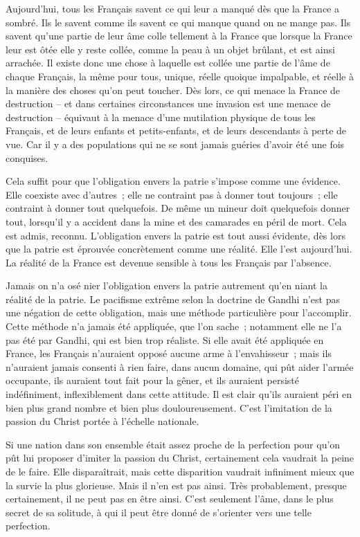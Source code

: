 \documentclass[french,twoside]{book} %
\begin{document}
Aujourd'hui, tous les Français savent ce qui leur a manqué dès que la France a sombré. Ils le savent comme ils savent ce qui manque quand on ne mange pas. Ils savent qu'une partie de leur âme colle tellement à la France que lorsque la France leur est ôtée elle y reste collée, comme la peau à un objet brûlant, et est ainsi arrachée. Il existe donc une chose à laquelle est collée une partie de l'âme de chaque Français, la même pour tous, unique, réelle quoique impalpable, et réelle à la manière des choses qu'on peut toucher. Dès lors, ce qui menace la France de destruction – et dans certaines circonstances une invasion est une menace de destruction – équivaut à la menace d'une mutilation physique de tous les Français, et de leurs enfants et petits-enfants, et de leurs descendants à perte de vue. Car il y a des populations qui ne se sont jamais guéries d'avoir été une fois conquises.\par
Cela suffit pour que l'obligation envers la patrie s'impose comme une évidence. Elle coexiste avec d'autres ; elle ne contraint pas à donner tout toujours ; elle contraint à donner tout quelquefois. De même un mineur doit quelquefois donner tout, lorsqu'il y a accident dans la mine et des camarades en péril de mort. Cela est admis, reconnu. L'obligation envers la patrie est tout aussi évidente, dès lors que la patrie est éprouvée concrètement comme une réalité. Elle l'est aujourd'hui. La réalité de la France est devenue sensible à tous les Français par l'absence.\par
Jamais on n'a osé nier l'obligation envers la patrie autrement qu'en niant la réalité de la patrie. Le pacifisme extrême selon la doctrine de Gandhi n'est pas une négation de cette obligation, mais une méthode particulière pour l'accomplir. Cette méthode n'a jamais été appliquée, que l'on sache ; notamment elle ne l'a pas été par Gandhi, qui est bien trop réaliste. Si elle avait été appliquée en France, les Français n'auraient opposé aucune arme à l'envahisseur ; mais ils n'auraient jamais consenti à rien faire, dans aucun domaine, qui pût aider l'armée occupante, ils auraient tout fait pour la gêner, et ils auraient persisté indéfiniment, inflexiblement dans cette attitude. Il est clair qu'ils auraient péri en bien plus grand nombre et bien plus douloureusement. C'est l'imitation de la passion du Christ portée à l'échelle nationale.\par
Si une nation dans son ensemble était assez proche de la perfection pour qu'on pût lui proposer d'imiter la passion du Christ, certainement cela vaudrait la peine de le faire. Elle disparaîtrait, mais cette disparition vaudrait infiniment mieux que la survie la plus glorieuse. Mais il n'en est pas ainsi. Très probablement, presque certainement, il ne peut pas en être ainsi. C'est seulement l'âme, dans le plus secret de sa solitude, à qui il peut être donné de s'orienter vers une telle perfection.\par
\end{document}
